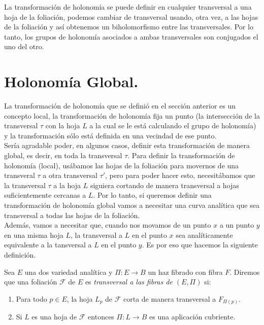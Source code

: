 
La transformación de holonomía se puede definir en cualquier transversal a una hoja de la foliación, podemos cambiar de transversal usando, otra vez, a las hojas de la foliación y así obtenemos un biholomorfismo entre las transversales. Por lo tanto, los grupos de holonomía asociados a ambas transversales son conjugados el uno del otro. 

\section{Holonomía Global.}

La transformación de holonomía que se definió en el sección anterior es un concepto local, la transformación de holonomía fija un punto (la intersección de la transversal $\tau$ con la hoja  $L$ a la cual se le está calculando el grupo de holonomía) y la transformación sólo está definida en una vecindad de ese punto.\\

Sería agradable poder, en algunos casos, definir esta transformación de manera global, es decir, en toda la transversal $\tau$. Para definir la transformación de holonomía (local), usábamos las hojas de la foliación para movernos de una transveral $\tau$ a otra transversal $\tau'$, pero para poder hacer esto, necesitábamos que la transversal $\tau$ a la hoja $L$ siguiera cortando de manera transversal a hojas suficientemente cercanas a $L$. Por lo tanto, si queremos definir una transformación de holonomía global vamos a necesitar una curva analítica que sea transversal a todas las hojas de la foliación.\\

Además, vamos a necesitar que, cuando nos movamos de un punto $x$ a un punto $y$ en una misma hoja $L$, la transversal a $L$ en el punto $x$ sea analíticamente equivalente a la tansversal a $L$ en el punto $y$. Es por eso que hacemos la siguiente definición.

\begin{defn}
\label{Def:FoliacionTransversal}
Sea $E$ una dos variedad analítica y $\Pi\colon E\rightarrow B$ un haz fibrado con fibra $F$. Diremos que una foliación $\mathcal{F}$ de $E$ es \emph{transversal a las fibras de $(E,\Pi)$} si:
\begin{enumerate}
\item Para todo $p\in E$, la hoja $L_{p}$ de $\mathcal{F}$ corta de manera transversal a $F_{\Pi(p)}$.

\item Si $L$ es una hoja de $\mathcal{F}$ entonces $\Pi\colon L\rightarrow B$ es una aplicación cubriente.
\end{enumerate}
\end{defn}

